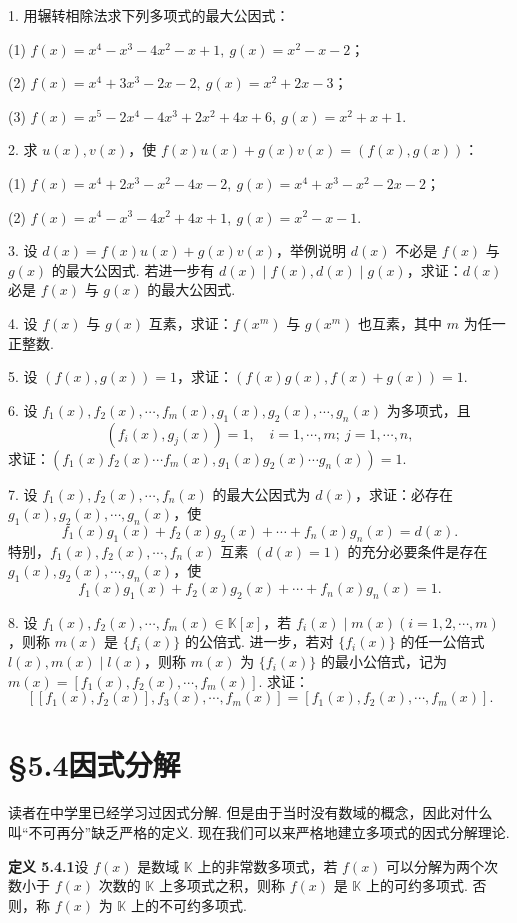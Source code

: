 \documentclass[UTF8, 12pt, fontset=fandol, oneside]{ctexart}
\begin{document}
1. 用辗转相除法求下列多项式的最大公因式：

(1) $f(x)=x^4-x^3-4x^2-x+1,\ g(x)=x^2-x-2$；

(2) $f(x)=x^4+3x^3-2x-2,\ g(x)=x^2+2x-3$；

(3) $f(x)=x^5-2x^4-4x^3+2x^2+4x+6,\ g(x)=x^2+x+1$.

2. 求 $u(x),v(x)$，使 $f(x)u(x)+g(x)v(x)=(f(x),g(x))$：

(1) $f(x)=x^4+2x^3-x^2-4x-2,\ g(x)=x^4+x^3-x^2-2x-2$；

(2) $f(x)=x^4-x^3-4x^2+4x+1,\ g(x)=x^2-x-1$.

3. 设 $d(x)=f(x)u(x)+g(x)v(x)$，举例说明 $d(x)$ 不必是 $f(x)$ 与 $g(x)$ 的最大公因式. 若进一步有 $d(x)\mid f(x),d(x)\mid g(x)$，求证：$d(x)$ 必是 $f(x)$ 与 $g(x)$ 的最大公因式.

4. 设 $f(x)$ 与 $g(x)$ 互素，求证：$f(x^m)$ 与 $g(x^m)$ 也互素，其中 $m$ 为任一正整数.

5. 设 $(f(x),g(x))=1$，求证：$(f(x)g(x),f(x)+g(x))=1$.

6. 设 $f_1(x),f_2(x),\cdots,f_m(x),g_1(x),g_2(x),\cdots,g_n(x)$ 为多项式，且
\[
(f_i(x),g_j(x))=1,\quad i=1,\cdots,m;\ j=1,\cdots,n,
\]
求证：$(f_1(x)f_2(x)\cdots f_m(x),g_1(x)g_2(x)\cdots g_n(x))=1$.

7. 设 $f_1(x),f_2(x),\cdots,f_n(x)$ 的最大公因式为 $d(x)$，求证：必存在 $g_1(x),g_2(x),\cdots,g_n(x)$，使
\[
f_1(x)g_1(x)+f_2(x)g_2(x)+\cdots+f_n(x)g_n(x)=d(x).
\]
特别，$f_1(x),f_2(x),\cdots,f_n(x)$ 互素 $(d(x)=1)$ 的充分必要条件是存在 $g_1(x),g_2(x),\cdots,g_n(x)$，使
\[
f_1(x)g_1(x)+f_2(x)g_2(x)+\cdots+f_n(x)g_n(x)=1.
\]

8. 设 $f_1(x),f_2(x),\cdots,f_m(x)\in\mathbb{K}[x]$，若 $f_i(x)\mid m(x)(i=1,2,\cdots,m)$，则称 $m(x)$ 是 $\{f_i(x)\}$ 的公倍式. 进一步，若对 $\{f_i(x)\}$ 的任一公倍式 $l(x),m(x)\mid l(x)$，则称 $m(x)$ 为 $\{f_i(x)\}$ 的最小公倍式，记为 $m(x)=[f_1(x),f_2(x),\cdots,f_m(x)]$. 求证：
\[
[[f_1(x),f_2(x)],f_3(x),\cdots,f_m(x)]=[f_1(x),f_2(x),\cdots,f_m(x)].
\]

\section*{§5.4\quad 因式分解}

读者在中学里已经学习过因式分解. 但是由于当时没有数域的概念，因此对什么叫“不可再分”缺乏严格的定义. 现在我们可以来严格地建立多项式的因式分解理论.

\noindent\textbf{定义 5.4.1}\quad 设 $f(x)$ 是数域 $\mathbb{K}$ 上的非常数多项式，若 $f(x)$ 可以分解为两个次数小于 $f(x)$ 次数的 $\mathbb{K}$ 上多项式之积，则称 $f(x)$ 是 $\mathbb{K}$ 上的可约多项式. 否则，称 $f(x)$ 为 $\mathbb{K}$ 上的不可约多项式.
\end{document}
